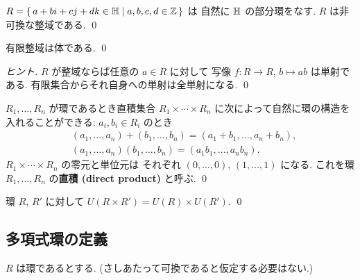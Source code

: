 \documentclass[12pt,twoside]{jarticle}
\begin{document}
\begin{example}
 $R=\{\,a+bi+cj+dk\in{\mathbb H}\mid a,b,c,d\in{\mathbb Z}\,\}$ は
 自然に ${\mathbb H}$ の部分環をなす.
 $R$ は非可換な整域である.
 \qed
\end{example}

\begin{question}
 有限整域は体である. \qed
\end{question}

\begin{proof}[ヒント]
 $R$ が整域ならば任意の $a\in R$ に対して
 写像 $f:R\to R$, $b\mapsto ab$ は単射である.
 有限集合からそれ自身への単射は全単射になる.
 \qed
\end{proof}

\begin{definition}[環の直積]
 $R_1,\ldots,R_n$ が環であるとき直積集合 $R_1\times\cdots\times R_n$ 
 に次によって自然に環の構造を入れることができる:
 $a_i,b_i\in R_i$ のとき
 \begin{align*}
  &
  (a_1,\ldots,a_n)+(b_1,\ldots,b_n)=(a_1+b_1,\ldots,a_n+b_n), 
  \\ &
  (a_1,\ldots,a_n)(b_1,\ldots,b_n)=(a_1b_1,\ldots,a_nb_n).
 \end{align*}
 $R_1\times\cdots\times R_n$ の零元と単位元は
 それぞれ $(0,\ldots,0)$, $(1,\ldots,1)$ になる.
 これを環 $R_1,\ldots,R_n$ の{\bf 直積 (direct product)} と呼ぶ.
 \qed
\end{definition}

\begin{question}
 環 $R$, $R'$ に対して $U(R\times R')=U(R)\times U(R')$. \qed
\end{question}


\subsection{多項式環の定義}

$R$ は環であるとする. (さしあたって可換であると仮定する必要はない.)
\end{document}
